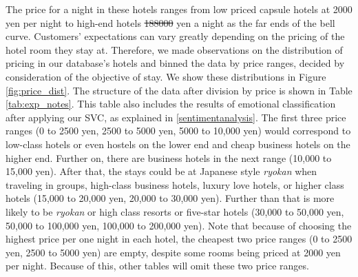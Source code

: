 \documentclass[smallextended,natbib]{svjour3}       %
\providecommand{\DIFadd}[1]{{\protect\color{blue}\uwave{#1}}} %
\providecommand{\DIFdel}[1]{{\protect\color{red}\sout{#1}}}                      %
\providecommand{\DIFaddbegin}{} %
\providecommand{\DIFaddend}{} %
\providecommand{\DIFdelbegin}{} %
\providecommand{\DIFdelend}{} %
\newcommand{\DIFscaledelfig}{0.5}
\newlength{\DIFdelgraphicswidth} %
\newlength{\DIFdelgraphicsheight} %
\newcommand{\DIFaddincludegraphics}[2][]{{\color{blue}\fbox{\DIFOincludegraphics[#1]{#2}}}} %
\newcommand{\DIFdelincludegraphics}[2][]{%
\sbox{\DIFdelgraphicsbox}{\DIFOincludegraphics[#1]{#2}}%
\settoboxwidth{\DIFdelgraphicswidth}{\DIFdelgraphicsbox} %
\settoboxtotalheight{\DIFdelgraphicsheight}{\DIFdelgraphicsbox} %
\scalebox{\DIFscaledelfig}{%
\parbox[b]{\DIFdelgraphicswidth}{\usebox{\DIFdelgraphicsbox}\\[-\baselineskip] \rule{\DIFdelgraphicswidth}{0em}}\llap{\resizebox{\DIFdelgraphicswidth}{\DIFdelgraphicsheight}{%
\setlength{\unitlength}{\DIFdelgraphicswidth}%
\begin{picture}(1,1)%
\thicklines\linethickness{2pt} %
{\color[rgb]{1,0,0}\put(0,0){\framebox(1,1){}}}%
{\color[rgb]{1,0,0}\put(0,0){\line( 1,1){1}}}%
{\color[rgb]{1,0,0}\put(0,1){\line(1,-1){1}}}%
\end{picture}%
}\hspace*{3pt}}} %
} %
\DeclareRobustCommand{\DIFaddbegin}{\DIFOaddbegin \let\includegraphics\DIFaddincludegraphics} %
\DeclareRobustCommand{\DIFaddend}{\DIFOaddend \let\includegraphics\DIFOincludegraphics} %
\DeclareRobustCommand{\DIFdelbegin}{\DIFOdelbegin \let\includegraphics\DIFdelincludegraphics} %
\DeclareRobustCommand{\DIFdelend}{\DIFOaddend \let\includegraphics\DIFOincludegraphics} %
\begin{document}
    The price for a night in these hotels ranges from low priced capsule hotels at 2000 yen per night to high-end hotels \DIFdelbegin \DIFdel{\num[group-separator={,}]{188000} }\DIFdelend \DIFaddbegin \DIFadd{188,000 }\DIFaddend yen a night as the far ends of the bell curve. Customers' expectations can vary greatly depending on the pricing of the hotel room they stay at. Therefore, we made observations on the distribution of pricing in our database's hotels and binned the data by price ranges, decided by consideration of the objective of stay. We show these distributions in Figure \ref{fig:price_dist}. The structure of the data after division by price is shown in Table \ref{tab:exp_notes}. This table also includes the results of emotional classification after applying our SVC, as explained in \ref{sentimentanalysis}. The first three price ranges (0 to 2500 yen, 2500 to 5000 yen, 5000 to 10,000 yen) would correspond to low-class hotels or even hostels on the lower end and cheap business hotels on the higher end. Further on, there are business hotels in the next range (10,000 to 15,000 yen). After that, the stays could be at Japanese style \textit{ryokan} when traveling in groups, high-class business hotels, luxury love hotels, or higher class hotels (15,000 to 20,000 yen, 20,000 to 30,000 yen). Further than that is more likely to be \textit{ryokan} or high class resorts or five-star hotels (30,000 to 50,000 yen, 50,000 to 100,000 yen, 100,000 to 200,000 yen). Note that because of choosing the highest price per one night in each hotel, the cheapest two price ranges (0 to 2500 yen, 2500 to 5000 yen) are empty, despite some rooms being priced at 2000 yen per night. Because of this, other tables will omit these two price ranges.
\end{document}
